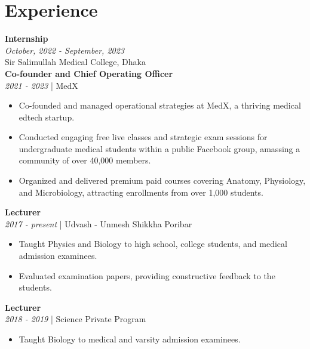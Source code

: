 \documentclass[a4paper,11pt]{article}
\newcommand{\resumeentry}[2]{
    \textbf{#1} \\
    \textit{#2}
}
\begin{document}
\begin{minipage}[t][6cm]{0.98\textwidth}
\section*{Experience}
\resumeentry{Internship}{October, 2022 - September, 2023}\\ Sir Salimullah Medical College, Dhaka \vspace{0.2cm} \\
\resumeentry{Co-founder and Chief Operating Officer}{2021 - 2023} | MedX
\begin{itemize}[left=0em, itemsep=0pt, parsep=0pt]
  \item Co-founded and managed operational strategies at MedX, a thriving medical edtech startup.
  \item Conducted engaging free live classes and strategic exam sessions for undergraduate medical students within a public Facebook group, amassing a community of over 40,000 members.
  \item Organized and delivered premium paid courses covering Anatomy, Physiology, and Microbiology, attracting enrollments from over 1,000 students.
\end{itemize}
\resumeentry{Lecturer}{2017 - present} | Udvash - Unmesh Shikkha Poribar
\begin{itemize}[left=0em, itemsep=10pt, parsep=-10pt]
  \item Taught Physics and Biology to high school, college students, and medical admission examinees.
  \item Evaluated examination papers, providing constructive feedback to the students.
\end{itemize}
\resumeentry{Lecturer}{2018 - 2019} | Science Private Program
\begin{itemize}[left=0em, itemsep=0pt, parsep=-10pt]
  \item Taught Biology to medical and varsity admission examinees.
\end{itemize}
\end{minipage}
\end{document}
